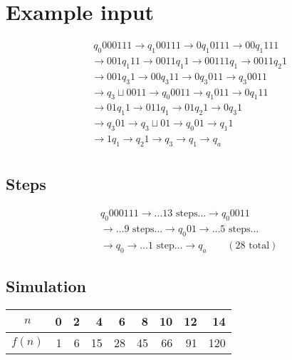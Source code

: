 \documentclass[a4paper, hidelinks, twocolumn, 9pt]{article}
\newcommand{\blm}{\sqcup}
\begin{document}
  \section*{Example input}
  
  \begin{align*}
    &\           q_0 000111    \rightarrow  q_1 00111  \rightarrow 0 q_1 0111 \rightarrow 00 q_1 111 \\
    &\rightarrow 001 q_1 11    \rightarrow 0011 q_1 1  \rightarrow 00111 q_1  \rightarrow 0011 q_2 1 \\
    &\rightarrow 001 q_3 1     \rightarrow 00 q_3 11   \rightarrow 0 q_3 011  \rightarrow q_3 0011   \\
    &\rightarrow q_3 \blm 0011 \rightarrow q_0 0011    \rightarrow q_1 011    \rightarrow 0 q_1 11   \\
    &\rightarrow 01 q_1 1      \rightarrow 011 q_1     \rightarrow 01 q_2 1   \rightarrow 0 q_3 1    \\
    &\rightarrow q_3 01        \rightarrow q_3 \blm 01 \rightarrow q_0 01     \rightarrow q_1 1      \\
    &\rightarrow 1 q_1         \rightarrow q_2 1       \rightarrow q_3        \rightarrow q_1 \rightarrow q_a \\
  \end{align*}

  \subsection*{Steps}
  \begin{align*}
    &q_0 000111 \rightarrow \ldots 13 \textrm{ steps} \ldots \rightarrow q_0 0011 \\
    &\rightarrow \ldots 9 \textrm{ steps} \ldots \rightarrow q_0 01 \rightarrow \ldots 5 \textrm{ steps} \ldots\\
    & \rightarrow q_0 \rightarrow \ldots 1 \textrm{ step} \ldots \rightarrow q_a \qquad (28 \textrm{ total})
  \end{align*}
  
  
    \subsection*{Simulation}
    
    \begin{center}
    \begin{tabular}{crrrrrrrr}
      \toprule
      $n$   & 0 &  2 &  4 &  6 &  8 & 10 & 12 &  14 \\
      \midrule
      $f(n)$ & 1 &  6 & 15 & 28 & 45 & 66 & 91 & 120 \\
      \bottomrule
    \end{tabular}
    \end{center}
    
\end{document}
